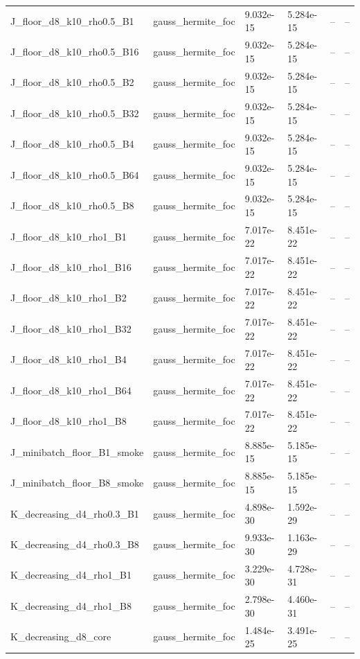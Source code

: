 \begin{tabular}{llllll}
J\_floor\_d8\_k10\_rho0.5\_B1 & gauss\_hermite\_foc & 9.032e-15 & 5.284e-15 & -- & -- \\
J\_floor\_d8\_k10\_rho0.5\_B16 & gauss\_hermite\_foc & 9.032e-15 & 5.284e-15 & -- & -- \\
J\_floor\_d8\_k10\_rho0.5\_B2 & gauss\_hermite\_foc & 9.032e-15 & 5.284e-15 & -- & -- \\
J\_floor\_d8\_k10\_rho0.5\_B32 & gauss\_hermite\_foc & 9.032e-15 & 5.284e-15 & -- & -- \\
J\_floor\_d8\_k10\_rho0.5\_B4 & gauss\_hermite\_foc & 9.032e-15 & 5.284e-15 & -- & -- \\
J\_floor\_d8\_k10\_rho0.5\_B64 & gauss\_hermite\_foc & 9.032e-15 & 5.284e-15 & -- & -- \\
J\_floor\_d8\_k10\_rho0.5\_B8 & gauss\_hermite\_foc & 9.032e-15 & 5.284e-15 & -- & -- \\
J\_floor\_d8\_k10\_rho1\_B1 & gauss\_hermite\_foc & 7.017e-22 & 8.451e-22 & -- & -- \\
J\_floor\_d8\_k10\_rho1\_B16 & gauss\_hermite\_foc & 7.017e-22 & 8.451e-22 & -- & -- \\
J\_floor\_d8\_k10\_rho1\_B2 & gauss\_hermite\_foc & 7.017e-22 & 8.451e-22 & -- & -- \\
J\_floor\_d8\_k10\_rho1\_B32 & gauss\_hermite\_foc & 7.017e-22 & 8.451e-22 & -- & -- \\
J\_floor\_d8\_k10\_rho1\_B4 & gauss\_hermite\_foc & 7.017e-22 & 8.451e-22 & -- & -- \\
J\_floor\_d8\_k10\_rho1\_B64 & gauss\_hermite\_foc & 7.017e-22 & 8.451e-22 & -- & -- \\
J\_floor\_d8\_k10\_rho1\_B8 & gauss\_hermite\_foc & 7.017e-22 & 8.451e-22 & -- & -- \\
J\_minibatch\_floor\_B1\_smoke & gauss\_hermite\_foc & 8.885e-15 & 5.185e-15 & -- & -- \\
J\_minibatch\_floor\_B8\_smoke & gauss\_hermite\_foc & 8.885e-15 & 5.185e-15 & -- & -- \\
K\_decreasing\_d4\_rho0.3\_B1 & gauss\_hermite\_foc & 4.898e-30 & 1.592e-29 & -- & -- \\
K\_decreasing\_d4\_rho0.3\_B8 & gauss\_hermite\_foc & 9.933e-30 & 1.163e-29 & -- & -- \\
K\_decreasing\_d4\_rho1\_B1 & gauss\_hermite\_foc & 3.229e-30 & 4.728e-31 & -- & -- \\
K\_decreasing\_d4\_rho1\_B8 & gauss\_hermite\_foc & 2.798e-30 & 4.460e-31 & -- & -- \\
K\_decreasing\_d8\_core & gauss\_hermite\_foc & 1.484e-25 & 3.491e-25 & -- & -- \\

\end{tabular}
